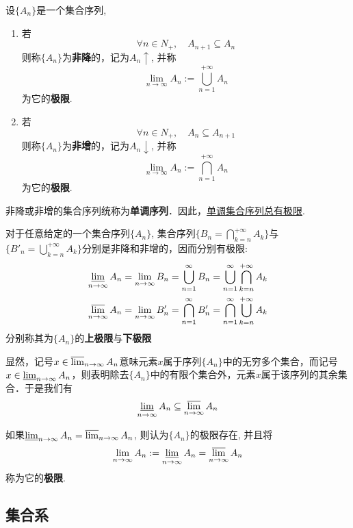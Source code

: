 \begin{definition}[集合的极限]
    设$\{ A_n \}$是一个集合序列,
    \begin{enumerate}
        \item 若
              \[ \forall n \in N_+ ,\quad A_{n+1} \subseteq A_n \]
              则称$\{ A_n \}$为\textbf{非降}的，记为$A_n\uparrow$, 并称
              \[ \lim_{n \to \infty}A_n := \bigcup_{n=1}^{+\infty}A_n \]
              为它的\textbf{极限}.
        \item 若
              \[ \forall n \in N_+ ,\quad A_{n} \subseteq A_{n+1} \]
              则称$\{ A_n \}$为\textbf{非增}的，记为$A_n\downarrow$, 并称
              \[ \lim_{n \to \infty}A_n := \bigcap_{n=1}^{+\infty}A_n \]
              为它的\textbf{极限}.
    \end{enumerate}
    非降或非增的集合序列统称为\textbf{单调序列}．因此，\underline{单调集合序列总有极限}.
\end{definition}

\begin{definition}[上极限与下极限]
    对于任意给定的一个集合序列$\{ A_n \}$, 集合序列$\{B_n= \bigcap_{k=n}^{+\infty}A_k \}$与$\{B'_n=  \bigcup_{k=n}^{+\infty}A_k \}$分别是非降和非增的，因而分别有极限:
    \begin{align*}
        \varliminf_{n \to \infty}A_n =\lim_{n \to \infty} B_n = \bigcup_{n=1}^{\infty} B_n= \bigcup_{n=1}^{\infty} \bigcap_{k=n}^{+\infty}A_k \\
        \varlimsup_{n \to \infty}A_n =\lim_{n \to \infty} B'_n = \bigcap_{n=1}^{\infty} B'_n= \bigcap_{n=1}^{\infty} \bigcup_{k=n}^{+\infty}A_k
    \end{align*}
    分别称其为$\{ A_n \}$的\textbf{上极限}与\textbf{下极限}
\end{definition}

显然，记号$x \in \varlimsup_{n \to \infty}A_n $意味元素$x$属于序列$\{ A_n \}$中的无穷多个集合，而记号$x \in \varliminf_{n \to \infty}A_n $，则表明除去$\{ A_n \}$中的有限个集合外，元素$x$属于该序列的其余集合．于是我们有
\[ \varliminf_{n \to \infty}A_n \subseteq  \varlimsup_{n \to \infty}A_n \]

\begin{definition}
    如果$\varliminf_{n \to \infty}A_n = \varlimsup_{n \to \infty}A_n$, 则认为$\{ A_n \}$的极限存在, 并且将
    \[ \lim_{n \to \infty}A_n := \varliminf_{n \to \infty}A_n = \varlimsup_{n \to \infty}A_n \]
    称为它的\textbf{极限}.
\end{definition}

\subsection{集合系}

